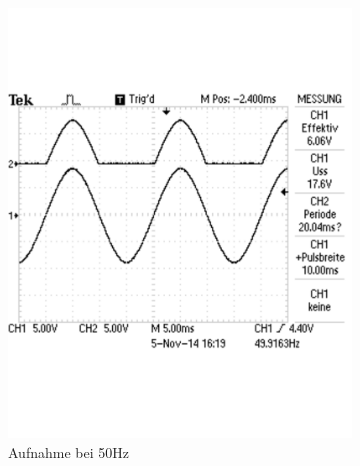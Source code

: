 \documentclass[12pt,a4paper]{article}
\begin{document}
\begin{figure}[H]
        \centering
        \begin{subfigure}[b]{0.28\textwidth}
                \includegraphics[width=\textwidth , scale = 0.4]{2_1_1.pdf}
                \caption[Aufnahme bei 50Hz]{Aufnahme bei 50Hz}
                \label{fig:2_1_1}
        \end{subfigure}%
        \hfill
        \begin{subfigure}[b]{0.28\textwidth}

\end{subfigure}
\end{figure}
\end{document}
